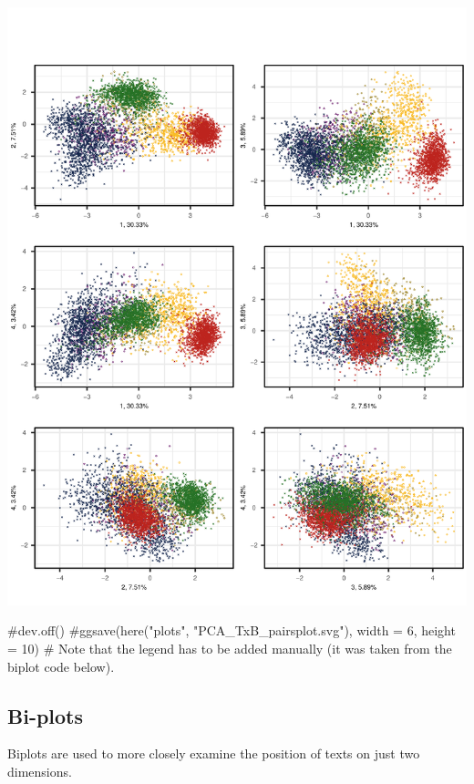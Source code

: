 \documentclass[
  letterpaper,
  DIV=11,
  numbers=noendperiod]{scrreprt}
\newenvironment{Shaded}{\begin{snugshade}}{\end{snugshade}}
\newcommand{\CommentTok}[1]{\textcolor[rgb]{0.37,0.37,0.37}{#1}}
\begin{document}
\includegraphics{AppendixH_files/figure-pdf/PCAtools-pairsplots-TxB-1.pdf}

\begin{Shaded}
\begin{Highlighting}[]
\CommentTok{\#dev.off()}
\CommentTok{\#ggsave(here("plots", "PCA\_TxB\_pairsplot.svg"), width = 6, height = 10)}
\CommentTok{\# Note that the legend has to be added manually (it was taken from the biplot code below).}
\end{Highlighting}
\end{Shaded}

\subsection{Bi-plots}\label{bi-plots-1}

Biplots are used to more closely examine the position of texts on just
two dimensions.
\end{document}
